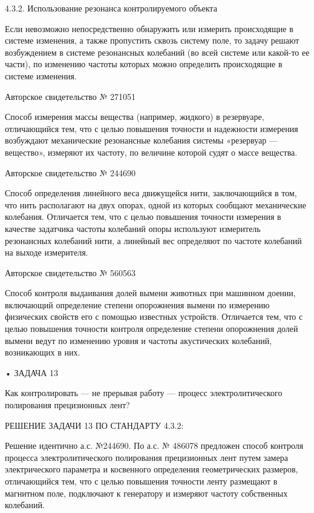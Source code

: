 4.3.2. Использование резонанса контролируемого объекта

Если невозможно непосредственно обнаружить или измерить происходящие в
системе изменения, а  также пропустить сквозь систему  поле, то задачу
решают возбуждением  в системе резонансных колебаний  (во всей системе
или какой-то ее части), по  изменению частоты которых можно определить
происходящие в системе изменения.


Авторское свидетельство № 271051

Способ  измерения массы  вещества  (например,  жидкого) в  резервуаре,
отличающийся  тем,  что  с   целью  повышения  точности  и  надежности
измерения  возбуждают   механические  резонансные   колебания  системы
«резервуар — вещество», измеряют их частоту, по величине которой судят
о массе вещества.


Авторское свидетельство № 244690

Способ  определения линейного  веса движущейся  нити, заключающийся  в
том, что  нить располагают на  двух опорах, одной из  которых сообщают
механические колебания. Отличается тем, что с целью повышения точности
измерения  в качестве  задатчика  частоты  колебаний опоры  используют
измеритель резонансных  колебаний нити,  а линейный вес  определяют по
частоте колебаний на выходе измерителя.


Авторское свидетельство № 560563

Способ контроля выдаивания долей  вымени животных при машинном доении,
включающий  определение   степени  опорожнения  вымени   по  измерению
физических  свойств  его  с помощью  известных  устройств.  Отличается
тем,  что  с целью  повышения  точности  контроля определение  степени
опорожнения  долей   вымени  ведут  по  изменению   уровня  и  частоты
акустических колебаний, возникающих в них.

• ЗАДАЧА 13

Как контролировать  — не прерывая работу  — процесс электролитического
полирования прецизионных лент?


РЕШЕНИЕ ЗАДАЧИ 13 ПО СТАНДАРТУ 4.3.2:

Решение  идентично а.с.  №244690. По  а.с. №  486078 предложен  способ
контроля  процесса  электролитического полирования  прецизионных  лент
путем  замера   электрического  параметра  и   косвенного  определения
геометрических  размеров,  отличающийся  тем, что  с  целью  повышения
точности ленту размещают  в магнитном поле, подключают  к генератору и
измеряют частоту собственных колебаний.


